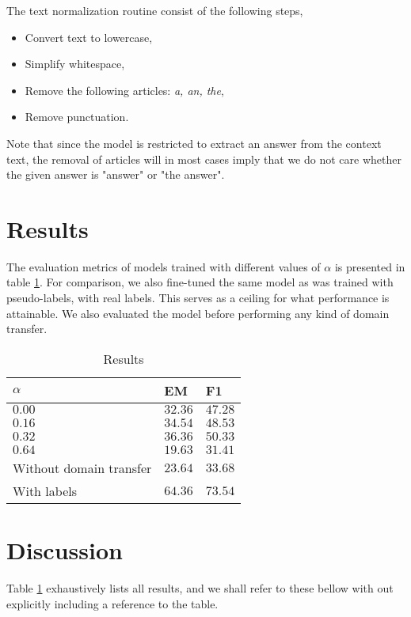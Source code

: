 \documentclass[twoside,twocolumn]{article}
\begin{document}
The text normalization routine consist of the following steps,
\begin{itemize}
	\itemsep0em 
	\item Convert text to lowercase,
	\item Simplify whitespace,
	\item Remove the following articles: \emph{a, an, the},
	\item Remove punctuation.
\end{itemize}
Note that since the model is restricted to extract an answer from the context
text, the removal of articles will in most cases imply that we do not care
whether the given answer is "answer" or "the answer".



\section{Results}
The evaluation metrics of models trained with different values of $\alpha$ is
presented in table \ref{table:results}. For comparison, we also fine-tuned the
same model as was trained with pseudo-labels, with real labels. This serves as a
ceiling for what performance is attainable. We also evaluated the model before
performing any kind of domain transfer.

\begin{table}
	\caption{Results}
	\label{table:results}
	\centering
	\begin{tabular}{l|ll}
		\toprule
		$\alpha$ & EM & F1 \\
		\midrule
		$0.00$ & $32.36$ & $47.28$ \\
		$0.16$ & $34.54$ & $48.53$ \\
		$0.32$ & $\mathbf{36.36}$ & $\mathbf{50.33}$ \\
		$0.64$ & $19.63$ & $31.41$ \\
		\toprule
		Without domain transfer & $23.64$ & $33.68$ \\
		With labels & $\mathbf{64.36}$ & $\mathbf{73.54}$ \\
		\bottomrule
	\end{tabular}
\end{table}

\section{Discussion}
Table \ref{table:results} exhaustively lists all results, and we shall refer to
these bellow with out explicitly including a reference to the table.
\end{document}
